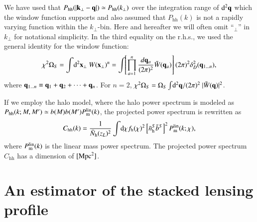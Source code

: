 \documentclass[onecolumn,notitlepage,showpacs,amsmath,amssymb,prd,floatfix]{revtex4-1}
\newcommand{\bx}{{\bf x}}
\newcommand{\bk}{{\bf k}}
\newcommand{\btheta}{{\bm{\theta}}}
\newcommand{\bq}{{\bf q}}
\newcommand{\tW}{\tilde{W}}
\newcommand{\dr}{\mathrm{d}}
\newcommand{\phh}{P_{\mathrm{hh}}}
\newcommand{\chh}{C_{\mathrm{hh}}}
\newcommand{\bh}{\mathrm{h}}
\newcommand{\bnh}{\frac{\dr n}{\dr M}}
\newcommand{\bnhs}{\bar{n}_{\rm h}^S}
\newcommand{\pml}{P^{\rm lin}_{\rm m}}
\newcommand{\bNh}{\bar{N}_{\rm h}}
\begin{document}
 We have used that $\phh(|\bk_\perp-\bq|)\simeq \phh(k_\perp)$ over
the integration range of $\dr^2\bq$ which the window function supports
and also assumed that $\phh(k)$ is not a rapidly varying function within
the $k_\perp$-bin. Here and hereafter we will often
omit ``$_{\perp}$'' in $k_{\perp}$ for notational simplicity.
In the
third equality on the r.h.s., we used the general identity for the
window function:
%
\begin{equation}
 \chi^2\Omega_S=\int\!\dr^2\bx_\perp~ W(\bx_\perp)^n=
  \int\!\!\left[\prod_{a=1}^n\frac{d\bq_a}{(2\pi)^2}\tW(\bq_a)\right](2\pi)^2
  \delta_D^2(\bq_{1\dots n}),
\end{equation}
%
where $\bq_{1\dots n}\equiv \bq_1+\bq_2+\cdots+\bq_n$. For $n=2$,
$\chi^2\Omega_S=\Omega_S\int\!\dr^2\bq/(2\pi)^2 ~ |\tW(\bq)|^2$.
%

 
If we employ the halo model, where the halo power spectrum is modeled as
$\phh(k; M, M')\simeq b(M)b(M')\pml(k)$, the projected power spectrum is
rewritten as
%
\begin{equation}
 \chh(k)=\frac{1}{\bNh(z_L)^2}\int\!\dr\chi
  f_\bh(\chi)^2 \left[\bnhs\bar{b}^S\right]^2
  \pml(k;\chi),
\end{equation}
%
where $\pml(k)$ is the linear mass power spectrum. The projected power
spectrum $\chh$ has a dimension of $[{\rm Mpc}^2]$.


\section{An estimator of the stacked lensing profile}
\end{document}
